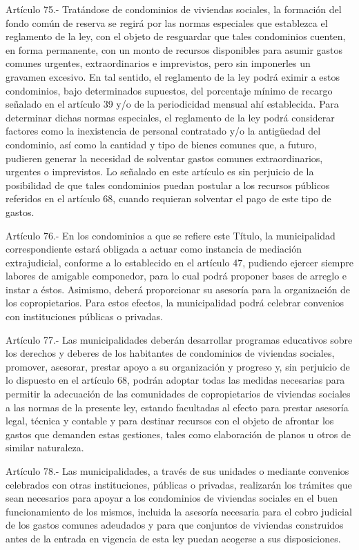     Artículo 75.- Tratándose de condominios de viviendas sociales, la formación del fondo común de reserva se regirá por las normas especiales que establezca el reglamento de la ley, con el objeto de resguardar que tales condominios cuenten, en forma permanente, con un monto de recursos disponibles para asumir gastos comunes urgentes, extraordinarios e imprevistos, pero sin imponerles un gravamen excesivo. En tal sentido, el reglamento de la ley podrá eximir a estos condominios, bajo determinados supuestos, del porcentaje mínimo de recargo señalado en el artículo 39 y/o de la periodicidad mensual ahí establecida.
    Para determinar dichas normas especiales, el reglamento de la ley podrá considerar factores como la inexistencia de personal contratado y/o la antigüedad del condominio, así como la cantidad y tipo de bienes comunes que, a futuro, pudieren generar la necesidad de solventar gastos comunes extraordinarios, urgentes o imprevistos.
    Lo señalado en este artículo es sin perjuicio de la posibilidad de que tales condominios puedan postular a los recursos públicos referidos en el artículo 68, cuando requieran solventar el pago de este tipo de gastos.
     
    Artículo 76.- En los condominios a que se refiere este Título, la municipalidad correspondiente estará obligada a actuar como instancia de mediación extrajudicial, conforme a lo establecido en el artículo 47, pudiendo ejercer siempre labores de amigable componedor, para lo cual podrá proponer bases de arreglo e instar a éstos. Asimismo, deberá proporcionar su asesoría para la organización de los copropietarios. Para estos efectos, la municipalidad podrá celebrar convenios con instituciones públicas o privadas.
   
    Artículo 77.- Las municipalidades deberán desarrollar programas educativos sobre los derechos y deberes de los habitantes de condominios de viviendas sociales, promover, asesorar, prestar apoyo a su organización y progreso y, sin perjuicio de lo dispuesto en el artículo 68, podrán adoptar todas las medidas necesarias para permitir la adecuación de las comunidades de copropietarios de viviendas sociales a las normas de la presente ley, estando facultadas al efecto para prestar asesoría legal, técnica y contable y para destinar recursos con el objeto de afrontar los gastos que demanden estas gestiones, tales como elaboración de planos u otros de similar naturaleza.
   
    Artículo 78.- Las municipalidades, a través de sus unidades o mediante convenios celebrados con otras instituciones, públicas o privadas, realizarán los trámites que sean necesarios para apoyar a los condominios de viviendas sociales en el buen funcionamiento de los mismos, incluida la asesoría necesaria para el cobro judicial de los gastos comunes adeudados y para que conjuntos de viviendas construidos antes de la entrada en vigencia de esta ley puedan acogerse a sus disposiciones.
     
